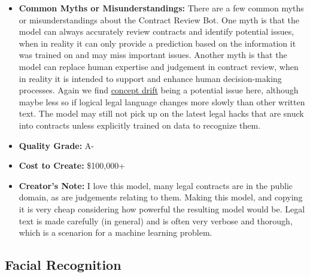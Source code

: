 \begin{itemize}
\begin{itemize}
    \item \textbf{Common Myths or Misunderstandings:} There are a few common myths or misunderstandings about the Contract Review Bot. One myth is that the model can always accurately review contracts and identify potential issues, when in reality it can only provide a prediction based on the information it was trained on and may miss important issues. Another myth is that the model can replace human expertise and judgement in contract review, when in reality it is intended to support and enhance human decision-making processes. Again we find \hyperref[sec:drift]{concept drift} being a potential issue here, although maybe less so if logical legal language changes more slowly than other written text. The model may still not pick up on the latest legal hacks that are snuck into contracts unless explicitly trained on data to recognize them.  
    \item \textbf{Quality Grade:} A-
    \item \textbf{Cost to Create:} \$100,000+
    \item \textbf{Creator's Note:} I love this model, many legal contracts are in the public domain, as are judgements relating to them. Making this model, and copying it is very cheap considering how powerful the resulting model would be. Legal text is made carefully (in general) and is often very verbose and thorough, which is a scenarion for a machine learning problem.  
\end{itemize}

\subsection{Facial Recognition}


\end{itemize}
